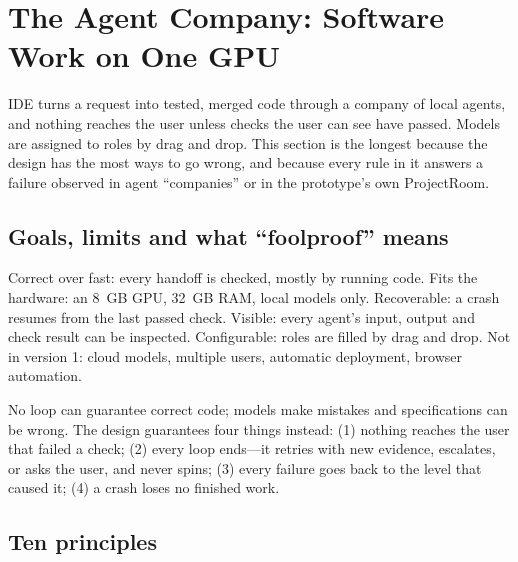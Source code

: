 \section{The Agent Company: Software Work on One GPU}
\label{sec:ide}

\hivi{} IDE turns a request into tested, merged code through a company of local agents, and nothing reaches the user unless checks the user can see have passed. Models are assigned to roles by drag and drop. This section is the longest because the design has the most ways to go wrong, and because every rule in it answers a failure observed in agent ``companies'' or in the prototype's own ProjectRoom.

\subsection{Goals, limits and what ``foolproof'' means}

Correct over fast: every handoff is checked, mostly by running code. Fits the hardware: an 8~GB GPU, 32~GB RAM, local models only. Recoverable: a crash resumes from the last passed check. Visible: every agent's input, output and check result can be inspected. Configurable: roles are filled by drag and drop. Not in version 1: cloud models, multiple users, automatic deployment, browser automation.

No loop can guarantee correct code; models make mistakes and specifications can be wrong. The design guarantees four things instead: (1) nothing reaches the user that failed a check; (2) every loop ends---it retries with new evidence, escalates, or asks the user, and never spins; (3) every failure goes back to the level that caused it; (4) a crash loses no finished work.

\subsection{Ten principles}

